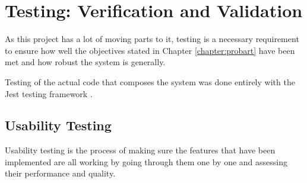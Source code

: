 \chapter{Testing: Verification and Validation}


As this project has a lot of moving parts to it, testing is a necessary requirement to ensure how well the objectives stated in Chapter \ref{chapter:probart} have been met and how robust the system is generally.

Testing of the actual code that composes the system was done entirely with the Jest testing framework \cite{jest}.

\section{Usability Testing} \label{test:usability}

Usability testing is the process of making sure the features that have been implemented are all working by going through them one by one and assessing their performance and quality.

